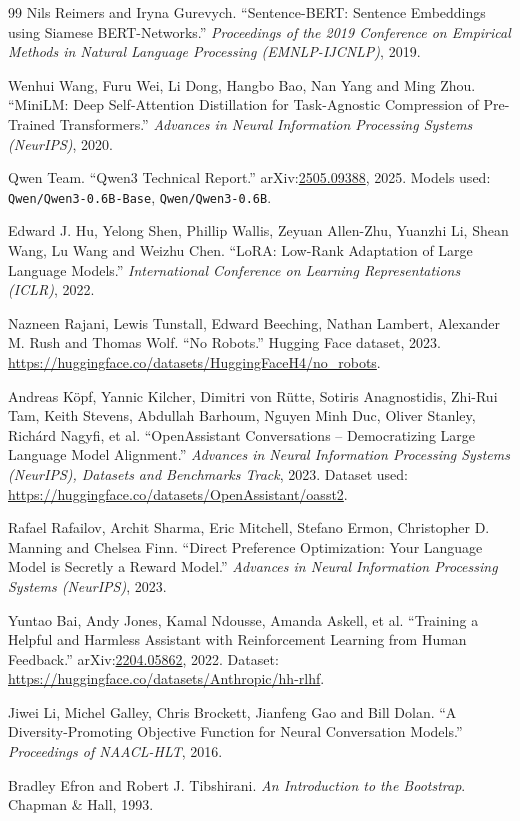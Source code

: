 \documentclass[11pt,a4paper]{article}
\begin{document}
\begin{thebibliography}{99}
Nils Reimers and Iryna Gurevych.
``Sentence-BERT: Sentence Embeddings using Siamese BERT-Networks.''
\emph{Proceedings of the 2019 Conference on Empirical Methods in Natural Language Processing (EMNLP-IJCNLP)}, 2019.

Wenhui Wang, Furu Wei, Li Dong, Hangbo Bao, Nan Yang and Ming Zhou.
``MiniLM: Deep Self-Attention Distillation for Task-Agnostic Compression of Pre-Trained Transformers.''
\emph{Advances in Neural Information Processing Systems (NeurIPS)}, 2020.

Qwen Team.
``Qwen3 Technical Report.''
arXiv:\href{https://arxiv.org/abs/2505.09388}{2505.09388}, 2025.
Models used: \texttt{Qwen/Qwen3-0.6B-Base}, \texttt{Qwen/Qwen3-0.6B}.

Edward J. Hu, Yelong Shen, Phillip Wallis, Zeyuan Allen-Zhu, Yuanzhi Li, Shean Wang, Lu Wang and Weizhu Chen.
``LoRA: Low-Rank Adaptation of Large Language Models.''
\emph{International Conference on Learning Representations (ICLR)}, 2022.

Nazneen Rajani, Lewis Tunstall, Edward Beeching, Nathan Lambert, Alexander M. Rush and Thomas Wolf.
``No Robots.''
Hugging Face dataset, 2023.
\url{https://huggingface.co/datasets/HuggingFaceH4/no_robots}.

Andreas K\"opf, Yannic Kilcher, Dimitri von R\"utte, Sotiris Anagnostidis, Zhi-Rui Tam, Keith Stevens, Abdullah Barhoum, Nguyen Minh Duc, Oliver Stanley, Rich\'ard Nagyfi, et al.
``OpenAssistant Conversations -- Democratizing Large Language Model Alignment.''
\emph{Advances in Neural Information Processing Systems (NeurIPS), Datasets and Benchmarks Track}, 2023.
Dataset used: \url{https://huggingface.co/datasets/OpenAssistant/oasst2}.

Rafael Rafailov, Archit Sharma, Eric Mitchell, Stefano Ermon, Christopher D. Manning and Chelsea Finn.
``Direct Preference Optimization: Your Language Model is Secretly a Reward Model.''
\emph{Advances in Neural Information Processing Systems (NeurIPS)}, 2023.

Yuntao Bai, Andy Jones, Kamal Ndousse, Amanda Askell, et al.
``Training a Helpful and Harmless Assistant with Reinforcement Learning from Human Feedback.''
arXiv:\href{https://arxiv.org/abs/2204.05862}{2204.05862}, 2022.
Dataset: \url{https://huggingface.co/datasets/Anthropic/hh-rlhf}.

Jiwei Li, Michel Galley, Chris Brockett, Jianfeng Gao and Bill Dolan.
``A Diversity-Promoting Objective Function for Neural Conversation Models.''
\emph{Proceedings of NAACL-HLT}, 2016.

Bradley Efron and Robert J. Tibshirani.
\emph{An Introduction to the Bootstrap}.
Chapman \& Hall, 1993.

\end{thebibliography}
\end{document}
